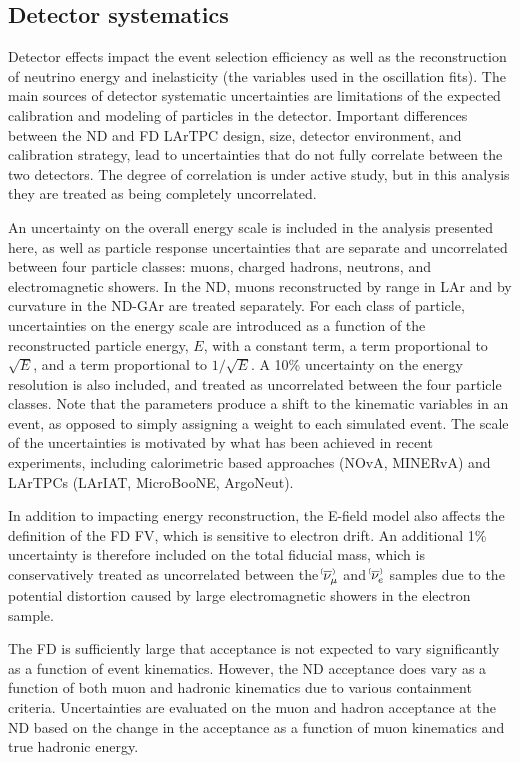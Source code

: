 \subsection{Detector systematics}
Detector effects impact the event selection efficiency as well as the reconstruction of neutrino energy and inelasticity (the variables used in the oscillation fits). The main sources of detector systematic uncertainties are limitations of the expected calibration and modeling of particles in the detector. Important differences between the ND and FD LArTPC design, size, detector environment, and calibration strategy, lead to uncertainties that do not fully correlate between the two detectors. The degree of correlation is under active study, but in this analysis they are treated as being completely uncorrelated.

An uncertainty on the overall energy scale is included in the analysis presented here, as well as particle response uncertainties that are separate and uncorrelated between four particle classes: muons, charged hadrons, neutrons, and electromagnetic showers. In the ND, muons reconstructed by range in LAr and by curvature in the ND-GAr are treated separately. For each class of particle, uncertainties on the energy scale are introduced as a function of the reconstructed particle energy, $E$, with a constant term, a term proportional to $\sqrt{E}$, and a term proportional to $1/\sqrt{E}$. A 10\% uncertainty on the energy resolution is also included, and treated as uncorrelated between the four particle classes. Note that the parameters produce a shift to the kinematic variables in an event, as opposed to simply assigning a weight to each simulated event. The scale of the uncertainties is motivated by what has been achieved in recent experiments, including calorimetric based approaches (NOvA, MINERvA) and LArTPCs (LArIAT, MicroBooNE, ArgoNeut).

In addition to impacting energy reconstruction, the E-field model also affects the definition of the FD FV, which is sensitive to electron drift. An additional 1\% uncertainty is therefore included on the total fiducial mass, which is conservatively treated as uncorrelated between the $\nu^{\bracketbar}_{\mu}$ and $\nu^{\bracketbar}_{e}$ samples due to the potential distortion caused by large electromagnetic showers in the electron sample.

The FD is sufficiently large that acceptance is not expected to vary significantly as a function of event kinematics. However, the ND acceptance does vary as a function of both muon and hadronic kinematics due to various containment criteria. Uncertainties are evaluated on the muon and hadron acceptance at the ND based on the change in the acceptance as a function of muon kinematics and true hadronic energy.

